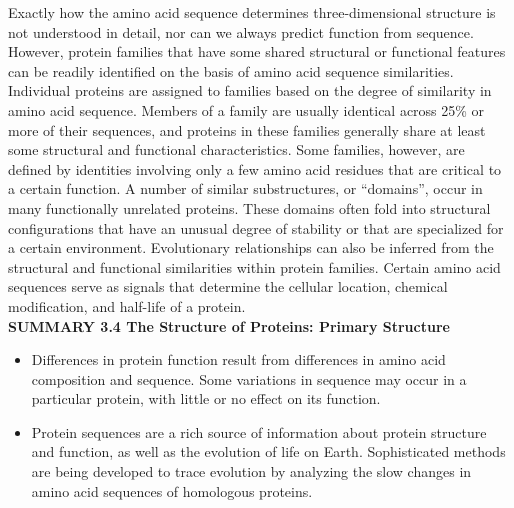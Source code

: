 Exactly how the amino acid sequence determines three-dimensional structure is not understood in detail, nor can we always predict function from sequence. However, protein families that have some shared structural or functional features can be readily identified on the basis of amino acid sequence similarities. Individual proteins are assigned to families based on the degree of similarity in amino acid sequence. Members of a family are usually identical across 25\% or more of their sequences, and proteins in these families generally share at least some structural and functional characteristics. Some families, however, are defined by identities involving only a few amino acid residues that are critical to a certain function. A number of similar substructures, or ``domains'', occur in many functionally unrelated proteins. These domains often fold into structural configurations that have an unusual degree of stability or that are specialized for a certain environment. Evolutionary relationships can also be inferred from the structural and functional similarities within protein families. Certain amino acid sequences serve as signals that determine the cellular location, chemical modification, and half-life of a protein. %
\\


\textbf{SUMMARY 3.4 The Structure of Proteins: Primary Structure}
\begin{itemize}
\item Differences in protein function result from differences in amino acid composition and sequence. Some variations in sequence may occur in a particular protein, with little or no effect on its function.
\item Protein sequences are a rich source of information about protein structure and function, as well as the evolution of life on Earth. Sophisticated methods are being developed to trace evolution by analyzing the slow changes in amino acid sequences of homologous proteins.
\end{itemize}






